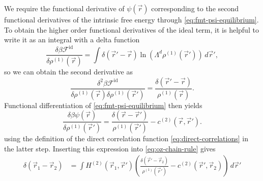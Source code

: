 We require the functional derivative of $\psi(\vec{r})$ corresponding to the second functional derivatives of the intrinsic free energy through \eqref{eq:fmt-psi-equilibrium}.
To obtain the higher order functional derivatives of the ideal term, it is helpful to write it as an integral with a delta function
\begin{equation*}
  \frac{
    \delta \beta \mathcal{F}^\mathrm{id}
  }{
    \delta \rho^{(1)}(\vec{r})
  }
  =
  \int \delta{(\vec{r}' - \vec{r})}
  \ln{(\Lambda^d \rho^{(1)}(\vec{r}'))} \, d\vec{r}',
\end{equation*}
so we can obtain the second derivative as
\begin{equation*}
  \frac{
    \delta^2 \beta \mathcal{F}^\mathrm{id}
  }{
    \delta \rho^{(1)}(\vec{r}) \delta \rho^{(1)}(\vec{r}')
  }
  =
  \frac{\delta(\vec{r}'-\vec{r})}{\rho^{(1)}(\vec{r})}.
\end{equation*}
Functional differentiation of \eqref{eq:fmt-psi-equilibrium} then yields
\begin{equation*}\label{eq:intrinsic-chemical-potential-inverse-derivative}
  \frac{\delta \beta \psi(\vec{r})}{\delta \rho^{(1)}(\vec{r}')}
  =
  \frac{\delta(\vec{r} - \vec{r}')}{\rho^{(1)}(\vec{r}')}
  - c^{(2)}(\vec{r}, \vec{r}').
\end{equation*}
using the definition of the direct correlation function \eqref{eq:direct-correlations} in the latter step.
Inserting this expression into \eqref{eq:oz-chain-rule} gives
\begin{equation*}
  \begin{split}
    \delta(\vec{r}_1 - \vec{r}_2)
    &=
    \int
    H^{(2)}(\vec{r}_1, \vec{r}')
    \left(
    \frac{\delta(\vec{r}' - \vec{r}_2)}{\rho^{(1)}(\vec{r}')} -
    c^{(2)}(\vec{r}', \vec{r}_2)
    \right)
    \, d\vec{r}'
  \end{split}
\end{equation*}
